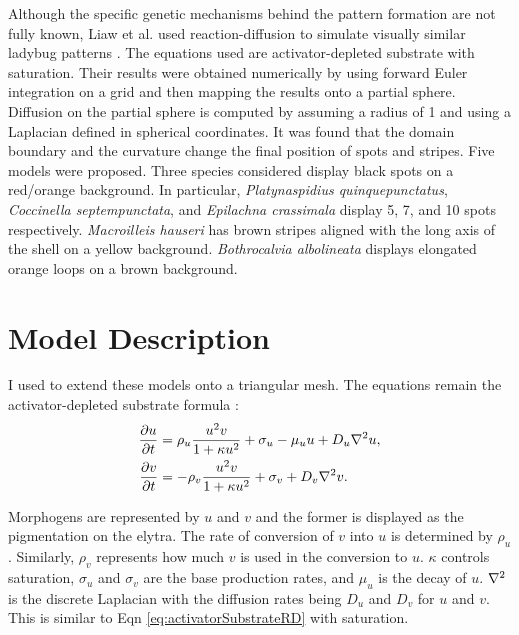 
Although the specific genetic mechanisms behind the pattern formation are not fully known, Liaw et al. used reaction-diffusion to simulate visually similar ladybug patterns \citep{Liaw2001}. The equations used are activator-depleted substrate with saturation. Their results were obtained numerically by using forward Euler integration on a grid and then mapping the results onto a partial sphere. Diffusion on the partial sphere is computed by assuming a radius of 1 and using a Laplacian defined in spherical coordinates. It was found that the domain boundary and the curvature change the final position of spots and stripes. Five models were proposed. Three species considered display black spots on a red/orange background. In particular, \textit{Platynaspidius quinquepunctatus}, \textit{Coccinella septempunctata}, and \textit{Epilachna crassimala} display 5, 7, and 10 spots respectively. \textit{Macroilleis hauseri} has brown stripes aligned with the long axis of the shell on a yellow background. \textit{Bothrocalvia albolineata} displays elongated orange loops on a brown background.

\section{Model Description} 
I used \ProgramName{} to extend these models onto a triangular mesh. The equations remain the activator-depleted substrate formula \citep{Gierer1972}:
\begin{equation}
	\begin{aligned} \label{eq:ladybugRD}
   \frac{\partial u}{\partial t} &= \rho_u \frac{u^2v}{1+\kappa u^2} + \sigma_u - \mu_u u + D_u \nabla^2 u, \\
   \frac{\partial v}{\partial t} &= -\rho_v \frac{u^2v}{1+\kappa u^2} + \sigma_v + D_v \nabla^2 v.
	\end{aligned}
\end{equation}

Morphogens are represented by $u$ and $v$ and the former is displayed as the pigmentation on the elytra. The rate of conversion of $v$ into $u$ is determined by $\rho_u$. Similarly, $\rho_v$ represents how much $v$ is used in the conversion to $u$. $\kappa$ controls saturation, $\sigma_u$ and $\sigma_v$ are the base production rates, and $\mu_u$ is the decay of $u$. $\nabla^2$ is the discrete Laplacian with the diffusion rates being $D_u$ and $D_v$ for $u$ and $v$. This is similar to Eqn \ref{eq:activatorSubstrateRD} with saturation.

